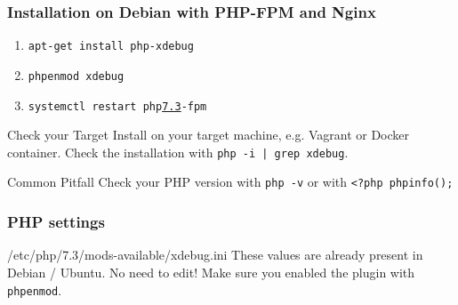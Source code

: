 \begin{frame}\frametitle{Installation on Debian with PHP-FPM and Nginx}
    \begin{enumerate}
        \item \texttt{apt-get install php-xdebug} \pause
        \item \texttt{phpenmod xdebug} \pause
        \item \texttt{systemctl restart php\underline{7.3}-fpm} \pause
    \end{enumerate}
    \begin{block}{Check your Target}
        Install on your target machine, e.g. Vagrant or Docker container. Check the installation with \texttt{php -i | grep xdebug}.
    \end{block}
    \pause
    \begin{alertblock}{Common Pitfall}
        Check your PHP version with \texttt{php -v} or with \texttt{<?php phpinfo();}
    \end{alertblock}
\end{frame}

\begin{frame}\frametitle{PHP settings}
    
    \begin{exampleblock}{/etc/php/7.3/mods-available/xdebug.ini}
        These values are already present in Debian / Ubuntu. No need to edit! Make sure you enabled the plugin with \texttt{phpenmod}.
    \end{exampleblock}
\end{frame}


